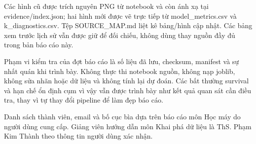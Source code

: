 \documentclass[12pt,a4paper]{article}
\begin{document}
Các hình cũ được trích nguyên PNG từ notebook và còn ánh xạ tại evidence/index.json; hai hình mới được vẽ trực tiếp từ model\_metrics.csv và k\_diagnostics.csv. Tệp SOURCE\_MAP.md liệt kê bảng/hình cập nhật. Các bảng xem trước lịch sử vẫn được giữ để đối chiếu, không dùng thay nguồn đầy đủ trong bản báo cáo này.

Phạm vi kiểm tra của đợt báo cáo là số liệu đã lưu, checksum, manifest và sự nhất quán khi trình bày. Không thực thi notebook nguồn, không nạp joblib, không sửa nhãn hoặc dữ liệu và không tính lại dự đoán. Các bất thường survival và hạn chế ổn định cụm vì vậy vẫn được trình bày như kết quả quan sát cần điều tra, thay vì tự thay đổi pipeline để làm đẹp báo cáo.

Danh sách thành viên, email và bố cục bìa dựa trên báo cáo môn Học máy do người dùng cung cấp. Giảng viên hướng dẫn môn Khai phá dữ liệu là ThS. Phạm Kim Thành theo thông tin người dùng xác nhận.
\end{document}

